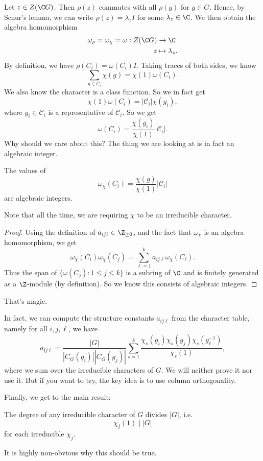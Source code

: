 \documentclass[a4paper]{article}
\begin{document}
Let $z \in Z(\C G)$. Then $\rho(z)$ commutes with all $\rho(g)$ for $g \in G$. Hence, by Schur's lemma, we can write $\rho(z) = \lambda_z I$ for some $\lambda_z \in \C$. We then obtain the algebra homomorphism
\begin{align*}
  \omega_\rho = \omega_\chi= \omega: Z(\C G) &\to \C\\
  z &\mapsto \lambda_z.
\end{align*}
By definition, we have $\rho(C_i) = \omega(C_i) I$. Taking traces of both sides, we know
\[
  \sum_{g \in \mathcal{C}_i} \chi(g) = \chi(1) \omega(C_i).
\]
We also know the character is a class function. So we in fact get
\[
  \chi(1) \omega(C_i) = |\mathcal{C}_i| \chi(g_i),
\]
where $g_i \in \mathcal{C}_i$ is a representative of $\mathcal{C}_i$. So we get
\[
  \omega(C_i) = \frac{\chi(g_i)}{\chi(1)} |\mathcal{C}_i|.
\]
Why should we care about this? The thing we are looking at is in fact an algebraic integer.
\begin{lemma}
  The values of
  \[
    \omega_\chi(C_i) = \frac{\chi(g)}{\chi(1)} |\mathcal{C}_i|
  \]
  are algebraic integers.
\end{lemma}
Note that all the time, we are requiring $\chi$ to be an irreducible character.
\begin{proof}
  Using the definition of $a_{ij\ell} \in \Z_{\geq 0}$, and the fact that $\omega_\chi$ is an algebra homomorphism, we get
  \[
    \omega_\chi(C_i) \omega_\chi(C_j) = \sum_{\ell = 1}^k a_{ij\ell} \omega_\chi (C_\ell).
  \]
  Thus the span of $\{\omega(C_j): 1 \leq j \leq k\}$ is a subring of $\C$ and is finitely generated as a $\Z$-module (by definition). So we know this consists of algebraic integers.
\end{proof}
That's magic.

In fact, we can compute the structure constants $a_{ij\ell}$ from the character table, namely for all $i, j, \ell$, we have
\[
  a_{ij\ell} = \frac{|G|}{|C_G(g_i)||C_G(g_j)|}\sum_{s = 1}^k \frac{\chi_s (g_i) \chi_s(g_j) \chi_s(g_\ell^{-1})}{\chi_s(1)},
\]
where we sum over the irreducible characters of $G$. We will neither prove it nor use it. But if you want to try, the key idea is to use column orthogonality.

Finally, we get to the main result:
\begin{thm}
  The degree of any irreducible character of $G$ divides $|G|$, i.e.
  \[
    \chi_j(1) \mid |G|
  \]
  for each irreducible $\chi_j$.
\end{thm}
It is highly non-obvious why this should be true.
\end{document}
